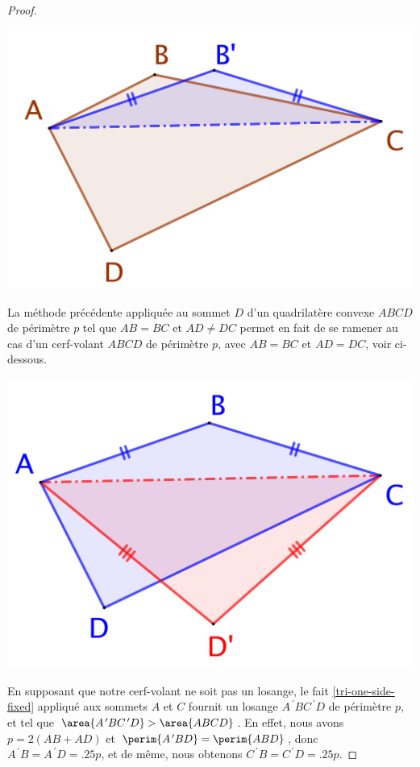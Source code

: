 \begin{proof}
	\begin{center}
		\includegraphics[scale=.4]{content/quadrilateral/convex-gene.png}
	\end{center}
	
	
	La méthode précédente appliquée au sommet $D$ d'un quadrilatère convexe $ABCD$ de périmètre $p$ tel que $AB = BC$ et $AD \neq DC$ permet en fait de se ramener au cas d'un cerf-volant $ABCD$ de périmètre $p$, avec $AB = BC$ et $AD = DC$, voir ci-dessous. 

	\begin{center}
		\includegraphics[scale=.4]{content/quadrilateral/convex-one-paire.png}
	\end{center}
	
	
	En supposant que notre cerf-volant ne soit pas un losange, le fait \ref{tri-one-side-fixed} appliqué aux sommets $A$ et $C$ fournit un losange $A^{\,\prime}BC^{\,\prime}D$ de périmètre $p$, et tel que $\area{A^{\,\prime}BC^{\,\prime}D} > \area{ABCD}$.
	En effet, nous avons
	$p = 2(AB + AD)$
	et
	$\perim{A^{\,\prime}BD} = \perim{ABD}$,
	donc
	$A^{\,\prime}B = A^{\,\prime}D = \num{.25} p$,
	et de même, nous obtenons
	$C^{\,\prime}B = C^{\,\prime}D = \num{.25} p$.


\end{proof}
